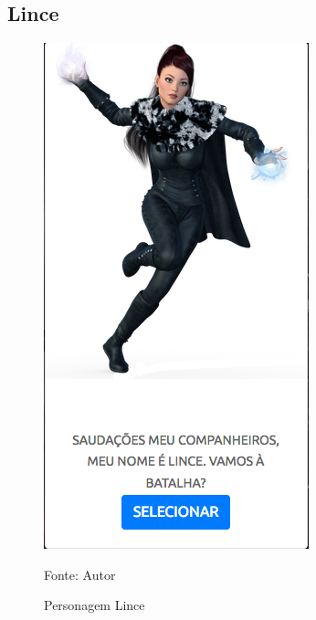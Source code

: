 \subsection{Lince}
\begin{figure}[h]
	\centering
	\includegraphics[keepaspectratio=true,scale=0.5]{figuras/lince.png}
	\caption{Personagem Lince}
	Fonte: Autor
	\label{lince}
\end{figure}

\clearpage

